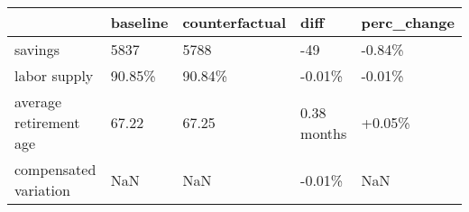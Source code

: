 \begin{tabular}{lllll}
\toprule
 & baseline & counterfactual & diff & perc_change \\
\midrule
savings & 5837 & 5788 & -49 & -0.84\% \\
labor supply & 90.85\% & 90.84\% & -0.01\% & -0.01\% \\
average retirement age & 67.22 & 67.25 & 0.38 months & +0.05\% \\
compensated variation & NaN & NaN & -0.01\% & NaN \\
\bottomrule
\end{tabular}
